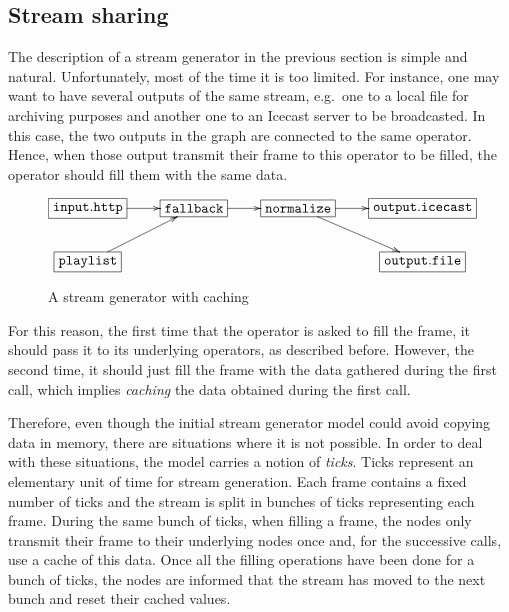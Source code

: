 \documentclass{llncs}
\newcommand{\eg}{{e.g.}}
\begin{document}
\subsection*{Stream sharing}

The description of a stream generator in the previous section is simple and 
natural. Unfortunately, most of the time it is too limited. For instance, one 
may want to have several outputs of the same 
stream, \eg\ one to a local file for archiving purposes and another one to an Icecast server to be
broadcasted.
In this case, the two outputs in the graph are connected to the same operator. Hence, when those output
transmit their frame to this operator to be filled, the operator should fill them with the same data.

\begin{figure}[htn]
 \begin{center}
\[
\xymatrix{
  *+[F]{\mathtt{input.http}}\ar[r]&*+[F]{\mathtt{fallback}}\ar[r]&
  *+[F]{\mathtt{normalize}}\ar[r]\ar[dr]&
  *+[F]{\mathtt{output.icecast}}\\
  *+[F]{\mathtt{playlist}}\ar[ur]& & & *+[F]{\mathtt{output.file}}\\
}
\]
\end{center}
 \caption{A stream generator with caching}
\end{figure}


For this reason, the first time that the operator is asked to fill the frame, it should pass it to its 
underlying operators, as described before. However, the second time, it should just fill the frame 
with the data gathered during the first call, which implies \textit{caching} the data obtained during the first call.

Therefore, even though the initial stream generator model could avoid copying data in memory, there 
are situations where it is not possible. In order to deal with these situations, the 
model carries a notion of \textit{ticks}. Ticks represent an elementary unit of time
for stream generation. Each frame contains a fixed number of ticks and the stream is split
in bunches of ticks representing each frame. During the same bunch of ticks, when filling a frame, the nodes only 
transmit their frame to their underlying nodes once and, for the successive calls, use a cache of this data. 
Once all the filling operations have been done for a bunch of ticks, the nodes are informed that the 
stream has moved to the next bunch and reset their cached values. 
\end{document}
